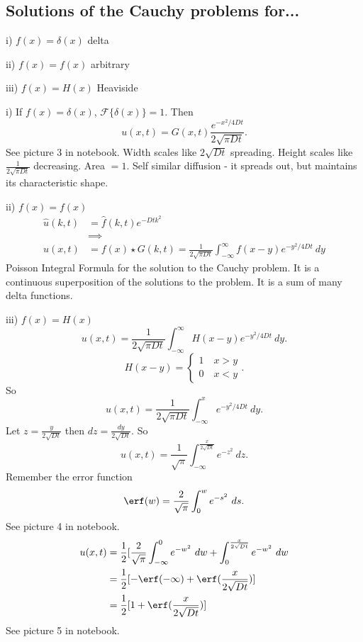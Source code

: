 \documentclass[cm]{article}
\newcommand{\fhat}{\hat{f}}
\renewcommand{\F}{\mathscr F}
\newcommand{\uhat}{\hat{u}}
\renewcommand{\infint}{\int_{-\infty}^{\infty}}
\begin{document}
\subsection{Solutions of the Cauchy problems for...}
\enum
\item[i)] $f(x) = \delta(x)$ delta
\item[ii)] $f(x) = f(x)$ arbitrary
\item[iii)] $f(x) = H(x)$ Heaviside
\xenum
~\\
\enum
\item[i)] If $f(x) = \delta(x)$, $\F \{ \delta (x) \} = 1$. Then
$$ u(x,t) = G(x,t)  \frac{e^{-x^2/4Dt}}{2 \sqrt{\pi D t}}.$$
See picture 3 in notebook. Width scales like $2 \sqrt{Dt}$ spreading. Height scales like $\frac{1}{2 \sqrt{\pi D t}}$ decreasing. Area $ = 1$. Self similar diffusion - it spreads out, but maintains its characteristic shape.
\item[ii)] $f(x) = f(x)$
\begin{align*}
\uhat(k,t) &= \fhat(k,t) e^{-Dtk^2} \\
&\implies \\
u(x,t) &= f(x) \star G(k,t) = \frac{1}{2\sqrt{\pi D t}} \infint f(x-y) e^{-y^2 / 4 D t} ~dy
\end{align*}
Poisson Integral Formula for the solution to the Cauchy problem. It is a continuous superposition of the solutions to the problem. It is a sum of many delta functions.
\item[iii)] $f(x) = H(x)$
$$u(x,t) = \frac{1}{2 \sqrt{\pi D t}} \infint H(x-y) e^{-y^2 / 4 Dt} ~dy.$$
$$H(x-y) = \begin{cases} 1 \quad x > y \\ 0 \quad x < y \end{cases}.$$
So
$$u(x,t) = \frac{1}{2 \sqrt{\pi D t}} \int_{-\infty}^{x} e^{-y^2 / 4 Dt} ~dy.$$
Let $z = \frac{y}{2 \sqrt{D t}}$ then $dz = \frac{dy}{2 \sqrt{Dt}}$.
So
$$ u(x,t) = \frac{1}{\sqrt{\pi}} \int_{-\infty}^{\frac{x}{2\sqrt{Dt}}} e^{-z^2}~dz.$$
Remember the error function
$$\erf(w) = \frac{2}{\sqrt{\pi}} \int_0^w e^{-s^2}~ds.$$
See picture 4 in notebook.
\begin{align*}
u(x,t) &= \frac{1}{2} [ \frac{2}{\sqrt{\pi}} \int_{-\infty}^0 e^{-w^2}~dw + \int_0^{\frac{x}{2 \sqrt{D t}}} e^{-w^2} ~dw \\
&= \frac{1}{2} [ - \erf(- \infty) + \erf( \frac{x}{2\sqrt{Dt}})] \\
&= \frac{1}{2} [ 1 + \erf(\frac{x}{2 \sqrt{Dt}})]
\end{align*}
See picture 5 in notebook.
\xenum
\end{document}
